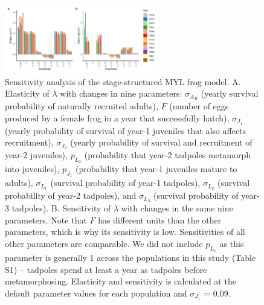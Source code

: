 \documentclass[9pt,twoside,lineno]{pnas-new-SI}
\begin{document}
\begin{figure}

{\centering \includegraphics[width=0.60\textwidth]{figures/pop_viability_figures_for_supp.jpg}

}

\caption{\label{fig-viability-supp}Sensitivity analysis of the
stage-structured MYL frog model. A. Elasticity of \(\lambda\) with
changes in nine parameters: \(\sigma_{A_R}\) (yearly survival
probability of naturally recruited adults), \(F\) (number of eggs
produced by a female frog in a year that successfully hatch),
\(\sigma_{J_1}\) (yearly probability of survival of year-1 juveniles
that also affects recruitment), \(\sigma_{J_2}\) (yearly probability of
survival and recruitment of year-2 juveniles), \(p_{L_2}\) (probability
that year-2 tadpoles metamorph into juveniles), \(p_{J_1}\) (probability
that year-1 juveniles mature to adults), \(\sigma_{L_1}\) (survival
probability of year-1 tadpoles), \(\sigma_{L_2}\) (survival probability
of year-2 tadpoles), and \(\sigma_{L_3}\) (survival probability of
year-3 tadpoles). B. Sensitivity of \(\lambda\) with changes in the same
nine parameters. Note that \(F\) has different units than the other
parameters, which is why its sensitivity is low. Sensitivities of all
other parameters are comparable. We did not include \(p_{L_1}\) as this
parameter is generally 1 across the populations in this study (Table S1)
-- tadpoles spend at least a year as tadpoles before metamorphosing.
Elasticity and sensitivity is calculated at the default parameter values
for each population and \(\sigma_{J_1}\) = 0.09.}

\end{figure}\clearpage

\newpage
\end{document}
